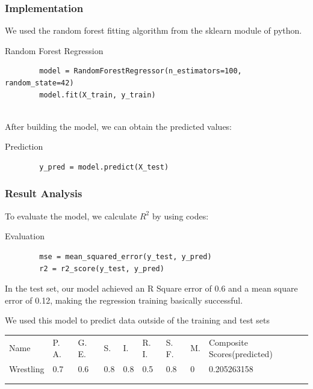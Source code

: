 \documentclass[a4paper]{article}
\begin{document}
\subsubsection{Implementation}
We used the random forest fitting algorithm from the sklearn module of python.\\
\begin{listing}[htb]\caption{Random Forest Regression}\label{code:processdweet}
    \begin{verbatim}
        model = RandomForestRegressor(n_estimators=100, random_state=42)
        model.fit(X_train, y_train)
    \end{verbatim} 
\end{listing}
\\[0.6em]
After building the model, we can obtain the predicted values:\\
\begin{listing}[h]\caption{Prediction}\label{code:pppd}
    \begin{verbatim}
        y_pred = model.predict(X_test)
    \end{verbatim}
\end{listing}


\subsubsection{Result Analysis}
To evaluate the model, we calculate $R^2$ by using codes:\\

\begin{listing}[htb]\caption{Evaluation}\label{code:pppd}
    \begin{verbatim}
        mse = mean_squared_error(y_test, y_pred)
        r2 = r2_score(y_test, y_pred)
    \end{verbatim}
\end{listing}
In the test set, our model achieved an R Square error of 0.6 and a mean square error of 0.12, making the regression training basically successful.


We used this model to predict data outside of the training and test sets

\iftrue\begin{table}[H]
    \begin{tabular}{lllllllll}
    Name      & P. A. & G. E. & S. & I. & R. I. & S. F. & M. & Composite Scores(predicted)        \\
    Wrestling & 0.7                          & 0.6           & 0.8            & 0.8         & 0.5                      & 0.8                  & 0     & 0.205263158 \\
              &                              &               &                &             &                          &                      &       &             \\
              &                              &               &                &             &                          &                      &       &            
    \end{tabular}
    \end{table}
\fi
\end{document}
